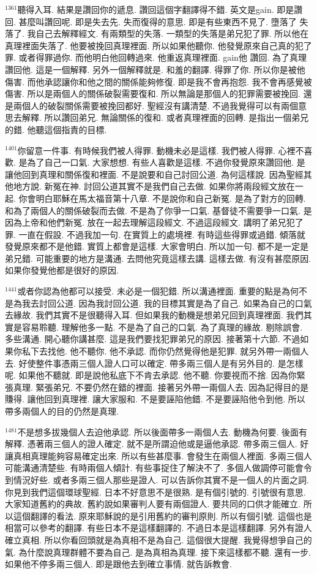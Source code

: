 \documentclass{book}
\begin{document}
$^{1361}$聽得入耳.
結果是讚回你的遞息.
讚回這個字翻譯得不錯.
英文是gain.
即是讚回.
甚麼叫讚回呢.
即是失去先.
失而復得的意思.
即是有些東西不見了.
墮落了 失落了.
我自己去解釋經文.
有兩類型的失落.
一類型的失落是弟兄犯了罪.
所以他在真理裡面失落了.
他要被挽回真理裡面.
所以如果他聽你.
他發覺原來自己真的犯了罪.
或者得罪過你.
而他明白他回轉過來.
他重返真理裡面.
gain他 讚回.
為了真理讚回他.
這是一個解釋.
另外一個解釋就是.
和羞的翻譯.
得罪了你.
所以你是被他傷害.
而他承認讓你和他之間的關係能夠修復.
即是我不會再抱怨.
我不會再感覺被傷害.
所以是兩個人的關係破裂需要復和.
所以無論是那個人的犯罪需要被挽回.
還是兩個人的破裂關係需要被挽回都好.
聖經沒有講清楚.
不過我覺得可以有兩個意思去解釋.
所以讚回弟兄.
無論關係的復和.
或者真理裡面的回轉.
是指出一個弟兄的錯.
他聽這個指責的目標.

$^{1401}$你留意一件事.
有時候我們被人得罪.
動機未必是這樣.
我們被人得罪.
心裡不喜歡.
是為了自己一口氣.
大家想想.
有些人喜歡是這樣.
不過你發覺原來讚回他.
是讓他回到真理和關係復和裡面.
不是說要和自己討回公道.
為何這樣說.
因為聖經其他地方說.
新冤在神.
討回公道其實不是我們自己去做.
如果你將兩段經文放在一起.
你會明白耶穌在馬太福音第十八章.
不是說你和自己新冤.
是為了對方的回轉.
和為了兩個人的關係破裂而去做.
不是為了你爭一口氣.
基督徒不需要爭一口氣.
是因為上帝和他們新冤.
放在一起去理解這段經文.
不過這段經文.
講明了弟兄犯了罪.
一直在假設.
不過我加一句.
在實質上的處境裡.
有時這些得罪或過錯.
傾落就發覺原來都不是他錯.
實質上都會是這樣.
大家會明白.
所以加一句.
都不是一定是弟兄錯.
可能重要的地方是溝通.
去問他究竟這樣去講.
這樣去做.
有沒有甚麼原因.
如果你發覺他都是很好的原因.

$^{1441}$或者你認為他都可以接受.
未必是一個犯錯.
所以溝通裡面.
重要的點是為何不是為我去討回公道.
因為我討回公道.
我的目標其實是為了自己.
如果為自己的口氣去緣故.
我們其實不是很聽得入耳.
但如果我的動機是想弟兄回到真理裡面.
我們其實是容易聆聽.
理解他多一點.
不是為了自己的口氣.
為了真理的緣故.
剔除誤會.
多些溝通.
開心聽你講甚麼.
這是我們要找犯罪弟兄的原因.
接著第十六節.
不過如果你私下去找他.
他不聽你.
他不承認.
而你仍然覺得他是犯罪.
就另外帶一兩個人去.
好使整件事憑兩三個人證人口可以確定.
帶多兩三個人是有另外目的.
是怎樣呢.
如果他不聽就.
即是說他私底下不肯去承認.
他不聽.
你要視而不捨.
因為你緊張真理.
緊張弟兄.
不要仍然在錯的裡面.
接著另外帶一兩個人去.
因為記得目的是賺得.
讓他回到真理裡.
讓大家服和.
不是要誣陷他錯.
不是要誣陷他令到他.
所以帶多兩個人的目的仍然是真理.

$^{1481}$不是想多拔幾個人去迫他承認.
所以後面帶多一兩個人去.
動機為何要.
後面有解釋.
憑著兩三個人的證人確定.
就不是所謂迫他或是逼他承認.
帶多兩三個人.
好讓真相真理能夠容易確定出來.
所以有些甚麼事.
會發生在兩個人裡面.
多兩三個人可能溝通清楚些.
有時兩個人傾計.
有些事捉住了解決不了.
多個人做調停可能會令到情況好些.
或者多兩三個人那些是證人.
可以告訴你其實不是一個人的片面之詞.
你見到我們這個環球聖經.
日本不好意思不是很熟.
是有個引號的.
引號很有意思.
大家知道舊約的典故.
舊約說如果審判人要有兩個證人.
要共同的口供才能確立.
所以這個翻譯的看法.
原來耶穌說的是引用舊約的審判原則.
所以有個引號.
這個也是相當可以參考的翻譯.
有些日本不是這樣翻譯的.
不過日本是這樣翻譯.
另外有證人確立真相.
所以你看回頭就是為真相不是為自己.
這個很大提醒.
我覺得想爭自己的氣.
為什麼說真理群體不要為自己.
是為真相為真理.
接下來這樣都不聽.
還有一步.
如果他不停多兩三個人.
即是跟他去到確立事情.
就告訴教會.
\end{document}
